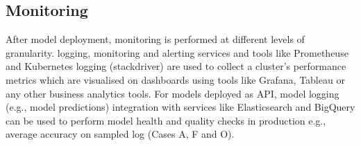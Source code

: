 \subsection{Monitoring}
After model deployment, monitoring is performed at different levels of granularity. \DIFdelbegin {}\DIFdelend \DIFaddbegin {}\DIFaddend logging, monitoring and alerting services and tools like Prometheuse and Kubernetes logging (stackdriver) are used to collect a cluster's performance metrics which are visualised on dashboards using tools like Grafana, Tableau or any other business analytics tools. For models deployed as API, model logging (e.g., model predictions) integration with services like Elasticsearch and BigQuery can be used to perform model health and quality checks in production e.g., average accuracy on sampled log (Cases A, F and O).



